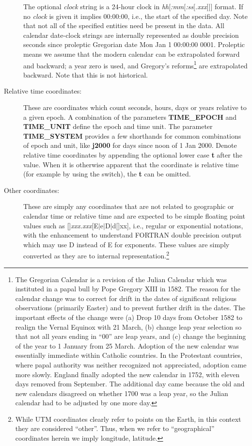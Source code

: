 \begin{description}
The optional \emph{clock} string is a 24-hour clock in \emph{hh}[\emph{:mm}[\emph{:ss}[\emph{.xxx}]]] format.
If no \emph{clock} is given
it implies 00:00:00, i.e., the start of the specified day.
Note that not all of the specified entities need be present in the data.  All calendar date-clock strings are internally represented as double precision seconds since
proleptic Gregorian date Mon Jan 1 00:00:00 0001.  Proleptic means we assume that the modern calendar
can be extrapolated forward and backward; a year zero is used, and Gregory's reforms\footnote{The Gregorian Calendar
is a revision of the Julian Calendar which was instituted in a papal bull by Pope Gregory XIII in 1582. The reason for the calendar
change was to correct for drift in the dates of significant religious observations (primarily Easter) and to prevent further drift
in the dates. The important effects of the change were (a) Drop 10 days from October 1582 to realign the Vernal Equinox with 21 March,
(b) change leap year selection so that not all years ending in ``00'' are leap years, and (c) change the beginning of the year to
1 January from 25 March.  Adoption of the new calendar was essentially immediate within Catholic countries. In the Protestant countries,
where papal authority was neither recognized not appreciated, adoption came more slowly. 
England finally adopted the new calendar in 1752, with eleven days removed from September. The additional day came because the old and
new calendars disagreed on whether 1700 was a leap year, so the Julian calendar had to be adjusted by one more day.} are extrapolated
backward.  Note that this is not historical.

\item [Relative time coordinates:]  These are coordinates which count seconds, hours, days or years relative to a
given epoch. A combination of the parameters \textbf{TIME\_EPOCH} and
\textbf{TIME\_UNIT} define the epoch and time unit. The parameter \textbf{TIME\_SYSTEM} provides a few shorthands for common combinations
of epoch and unit, like \textbf{j2000} for days since noon of 1 Jan 2000.
Denote relative time coordinates by appending the optional lower case
\textbf{t} after the value.  When it is otherwise apparent that the coordinate is relative time (for example by using
the  switch), the \textbf{t} can be omitted.

\item [Other coordinates:]  These are simply any coordinates that are not related to geographic or calendar time or relative
time and are
expected to be simple floating point values such as [\PM]\emph{xxx.xxx}[E$|$e$|$D$|$d[\PM]xx], i.e., regular or exponential
notations, with the enhancement to understand FORTRAN double precision output which may use D instead of E for exponents.
These values are simply converted as they are to internal representation.\footnote{While
UTM coordinates clearly refer to points on the Earth, in this context they are considered ``other''.  Thus, when we
refer to ``geographical'' coordinates herein we imply longitude, latitude.}
\end{description}

